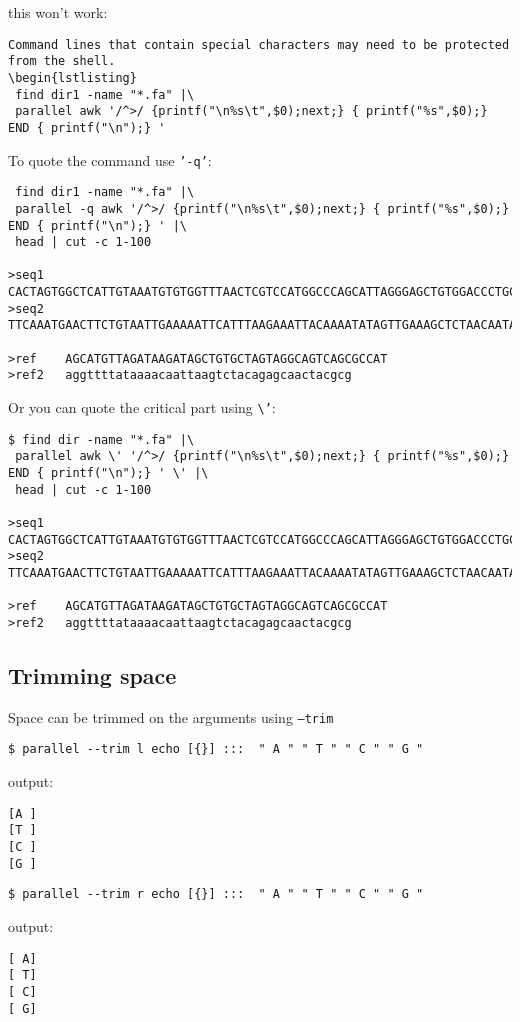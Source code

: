 \documentclass{article}
\begin{document}
this won't work:
\begin{lstlisting}
Command lines that contain special characters may need to be protected from the shell.
\begin{lstlisting}
 find dir1 -name "*.fa" |\
 parallel awk '/^>/ {printf("\n%s\t",$0);next;} { printf("%s",$0);} END { printf("\n");} ' 
\end{lstlisting}
To quote the command use \texttt{'-q'}:
\begin{lstlisting}
 find dir1 -name "*.fa" |\
 parallel -q awk '/^>/ {printf("\n%s\t",$0);next;} { printf("%s",$0);} END { printf("\n");} ' |\
 head | cut -c 1-100

>seq1	CACTAGTGGCTCATTGTAAATGTGTGGTTTAACTCGTCCATGGCCCAGCATTAGGGAGCTGTGGACCCTGCAGCCTGGCTGTGGGGGCCGCAGT
>seq2	TTCAAATGAACTTCTGTAATTGAAAAATTCATTTAAGAAATTACAAAATATAGTTGAAAGCTCTAACAATAGACTAAACCAAGCAGAAGAAAGA

>ref	AGCATGTTAGATAAGATAGCTGTGCTAGTAGGCAGTCAGCGCCAT
>ref2	aggttttataaaacaattaagtctacagagcaactacgcg
\end{lstlisting}

Or you can quote the critical part using \texttt{\textbackslash{}'}:
\begin{lstlisting}
$ find dir -name "*.fa" |\
 parallel awk \' '/^>/ {printf("\n%s\t",$0);next;} { printf("%s",$0);} END { printf("\n");} ' \' |\
 head | cut -c 1-100

>seq1	CACTAGTGGCTCATTGTAAATGTGTGGTTTAACTCGTCCATGGCCCAGCATTAGGGAGCTGTGGACCCTGCAGCCTGGCTGTGGGGGCCGCAGT
>seq2	TTCAAATGAACTTCTGTAATTGAAAAATTCATTTAAGAAATTACAAAATATAGTTGAAAGCTCTAACAATAGACTAAACCAAGCAGAAGAAAGA

>ref	AGCATGTTAGATAAGATAGCTGTGCTAGTAGGCAGTCAGCGCCAT
>ref2	aggttttataaaacaattaagtctacagagcaactacgcg
\end{lstlisting}


\subsection{Trimming space}
Space can be trimmed on the arguments using  \texttt{--trim}
\begin{lstlisting}
$ parallel --trim l echo [{}] :::  " A " " T " " C " " G "
\end{lstlisting}
output:
\begin{lstlisting}
[A ]
[T ]
[C ]
[G ]
\end{lstlisting}

\begin{lstlisting}
$ parallel --trim r echo [{}] :::  " A " " T " " C " " G "
\end{lstlisting}
output:
\begin{lstlisting}
[ A]
[ T]
[ C]
[ G]
\end{lstlisting}
\end{document}
